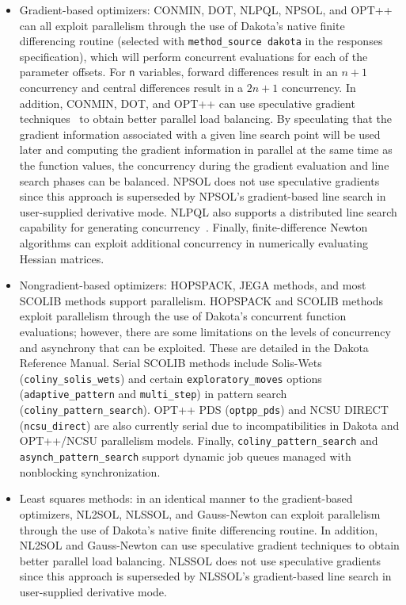 \begin{itemize}
\item Gradient-based optimizers: CONMIN, DOT, NLPQL, NPSOL, and OPT++
  can all exploit parallelism through the use of Dakota's native finite
  differencing routine (selected with \texttt{method\_source dakota}
  in the responses specification), which will perform concurrent
  evaluations for each of the parameter offsets. For \texttt{n}
  variables, forward differences result in an $n+1$ concurrency and
  central differences result in a $2n+1$ concurrency. In addition,
  CONMIN, DOT, and OPT++ can use speculative gradient
  techniques~\cite{Byr88} to obtain better parallel load balancing. By
  speculating that the gradient information associated with a given
  line search point will be used later and computing the gradient
  information in parallel at the same time as the function values, the
  concurrency during the gradient evaluation and line search phases
  can be balanced. NPSOL does not use speculative gradients since this
  approach is superseded by NPSOL's gradient-based line search in
  user-supplied derivative mode.  NLPQL also supports a distributed
  line search capability for generating concurrency~\cite{Sch04}.
  Finally, finite-difference Newton algorithms can exploit additional
  concurrency in numerically evaluating Hessian matrices. %

\item Nongradient-based optimizers: HOPSPACK, JEGA methods, and most
  SCOLIB methods support parallelism.  HOPSPACK and SCOLIB methods
  exploit parallelism through the use of Dakota's concurrent function
  evaluations; however, there are some limitations on the levels of
  concurrency and asynchrony that can be exploited.  These are detailed
  in the Dakota Reference Manual. Serial SCOLIB methods include
  Solis-Wets (\texttt{coliny\_solis\_wets}) and certain
  \texttt{exploratory\_moves} options (\texttt{adaptive\_pattern} and
  \texttt{multi\_step}) in pattern search
  (\texttt{coliny\_pattern\_search}).  OPT++ PDS (\texttt{optpp\_pds})
  and NCSU DIRECT (\texttt{ncsu\_direct}) are also currently serial
  due to incompatibilities in Dakota and OPT++/NCSU parallelism
  models.  Finally, \texttt{coliny\_pattern\_search} and
  \texttt{asynch\_pattern\_search} support dynamic job queues managed
  with nonblocking synchronization.

\item Least squares methods: in an identical manner to the
  gradient-based optimizers, NL2SOL, NLSSOL, and Gauss-Newton can
  exploit parallelism through the use of Dakota's native finite
  differencing routine. In addition, NL2SOL and Gauss-Newton can use
  speculative gradient techniques to obtain better parallel load
  balancing. NLSSOL does not use speculative gradients since this
  approach is superseded by NLSSOL's gradient-based line search in
  user-supplied derivative mode.


\end{itemize}
